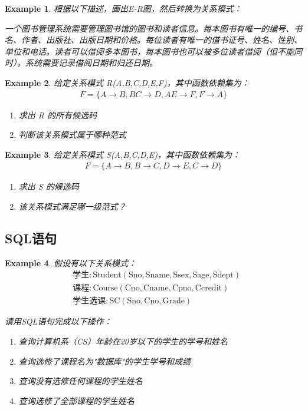 \documentclass{../../note}
\newtheorem{example}{Example}
\begin{document}
\begin{example}
根据以下描述，画出E-R图，然后转换为关系模式：

一个图书管理系统需要管理图书馆的图书和读者信息。每本图书有唯一的编号、书名、作者、出版社、出版日期和价格。每位读者有唯一的借书证号、姓名、性别、单位和电话。读者可以借阅多本图书，每本图书也可以被多位读者借阅（但不能同时）。系统需要记录借阅日期和归还日期。
\end{example}

\begin{example}
给定关系模式 R(A,B,C,D,E,F)，其中函数依赖集为：
\begin{align*}
F = \{A \rightarrow B, BC \rightarrow D, AE \rightarrow F, F \rightarrow A\}
\end{align*}

\begin{enumerate}
  \item 求出 R 的所有候选码
  \item 判断该关系模式属于哪种范式
\end{enumerate}
\end{example}

\begin{example}
给定关系模式 S(A,B,C,D,E)，其中函数依赖集为：
\begin{align*}
F = \{A \rightarrow B, B \rightarrow C, D \rightarrow E, C \rightarrow D\}
\end{align*}

\begin{enumerate}
  \item 求出 S 的候选码
  \item 该关系模式满足哪一级范式？
\end{enumerate}
\end{example}


\subsection{SQL语句}

\begin{example}
假设有以下关系模式：
\begin{align*}
&\text{学生}: \text{Student}(\underline{\text{Sno}}, \text{Sname}, \text{Ssex}, \text{Sage}, \text{Sdept})\\
&\text{课程}: \text{Course}(\underline{\text{Cno}}, \text{Cname}, \text{Cpno}, \text{Ccredit})\\
&\text{学生选课}: \text{SC}(\underline{\text{Sno}}, \underline{\text{Cno}}, \text{Grade})
\end{align*}

请用SQL语句完成以下操作：
\begin{enumerate}
  \item 查询计算机系（CS）年龄在20岁以下的学生的学号和姓名
  \item 查询选修了课程名为"数据库"的学生学号和成绩
  \item 查询没有选修任何课程的学生姓名
  \item 查询选修了全部课程的学生姓名
\end{enumerate}
\end{example}
\end{document}
